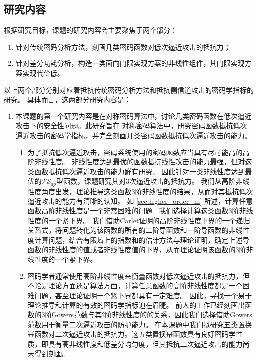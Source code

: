\documentclass[a4paper,zihao=-4,AutoFakeBold]{ctexart}
\begin{document}
\subsection{研究内容}
根据研究目标，课题的研究内容会主要聚焦于两个部分：
\begin{enumerate}[label=\arabic{*})]
    \item 针对传统密码分析方法，刻画几类密码函数对低次逼近攻击的抵抗力；
    \item 针对差分功耗分析，构造一类面向门限实现方案的非线性组件，其门限实现方案实现代价低。
\end{enumerate}
以上两个部分分别对应着抵抗传统密码分析方法和抵抗侧信道攻击的密码学指标的研究。
具体而言，这两部分研究内容是：
\begin{enumerate}[label=(\arabic{*})]
    \item 本课题的第一个研究内容是在对称密码算法中，讨论几类密码函数在低次逼近攻击下的安全性问题。此研究旨在
    对称密码算法中，研究密码函数抵抗低次逼近攻击的密码学指标，并完全刻画几类密码函数抵抗低次逼近攻击的能力。
    \begin{enumerate}
        \item 为了抵抗低次逼近攻击，密码系统使用的密码函数应当具有尽可能高的高阶非线性度。
        非线性度达到最优的函数抵抗线性攻击的能力最强，但对这类函数抵抗低次逼近攻击的能力鲜有研究。
        因此针对一类非线性度达到最优的$\mathcal{PS}_{ap}$型函数，课题研究其对$3$次逼近攻击的抵抗力。
        我们从高阶非线性度角度出发，理论推导这类函数$3$阶非线性度的结果，从而对其抵抗低次逼近攻击的能力有清晰的认知。
        如 \ref{sec:higher_order_nl} 所述，计算任意函数高阶非线性度是一个非常困难的问题，我们选择计算这类函数$3$阶非线性度的一个紧下界。
        我们借助Carlet证明的高阶非线性度下界的一个递归关系式，将问题转化为该函数的所有的二阶导函数和一阶导函数的非线性度计算问题，结合有限域上的指数和的估计方法与理论证明，确定上述导函数的非线性度的值或者非线性度值的下界，从而理论证明该函数的$3$阶非线性度的一个紧下界。
        \item 密码学者通常使用高阶非线性度来衡量函数对低次逼近攻击的抵抗力，但不论是理论方面还是算法方面，计算任意函数的高阶非线性度都是一个困难问题，甚至理论证明一个紧下界都具有一定难度。
        因此，寻找一个易于理论推导和计算的有效的密码学指标迫在眉睫。
        前人的工作已经刻画出函数的$3$阶Gowers范数与其$2$阶非线性度的的关系，因此我们选择借助Gowers范数用于衡量二次逼近攻击的防护能力。
        在本课题中我们拟研究五类置换幂函数对二次逼近攻击的抵抗力。这五类置换幂函数具有良好密码学性质，即具有高非线性度和低差分均匀度，但其抵抗二次逼近攻击的能力尚未得到刻画。

\end{enumerate}
\end{enumerate}
\end{document}
